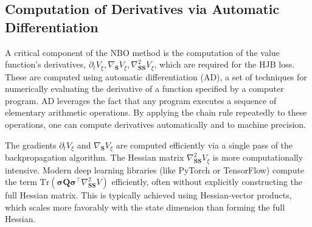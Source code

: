 \documentclass[ecta]{econsocart}
\theoremstyle{plain}
\theoremstyle{remark}
\newcommand{\statevec}{\bm{S}}
\begin{document}
\subsection{Computation of Derivatives via Automatic Differentiation}
A critical component of the NBO method is the computation of the value function's derivatives, $\partial_t V_\xi, \nabla_{\statevec} V_\xi, \nabla_{\statevec\statevec}^2 V_\xi$, which are required for the HJB loss. These are computed using automatic differentiation (AD), a set of techniques for numerically evaluating the derivative of a function specified by a computer program. AD leverages the fact that any program executes a sequence of elementary arithmetic operations. By applying the chain rule repeatedly to these operations, one can compute derivatives automatically and to machine precision.

The gradients $\partial_t V_\xi$ and $\nabla_{\statevec} V_\xi$ are computed efficiently via a single pass of the backpropagation algorithm. The Hessian matrix $\nabla_{\statevec\statevec}^2 V_\xi$ is more computationally intensive. Modern deep learning libraries (like PyTorch or TensorFlow) compute the term $\text{Tr}(\bm{\sigma} \bm{Q} \bm{\sigma}^\top \nabla_{\statevec\statevec}^2 V)$ efficiently, often without explicitly constructing the full Hessian matrix. This is typically achieved using Hessian-vector products, which scales more favorably with the state dimension than forming the full Hessian.
\end{document}
